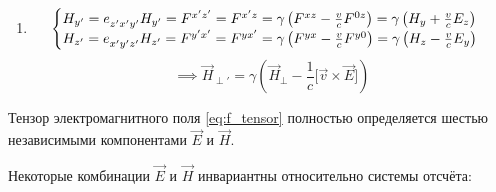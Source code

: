 \documentclass{article}
\begin{document}
\begin{enumerate}
    \item
    \begin{equation*}
        \begin{cases}
        H_{y'}=\tensor{e}{_{z'}_{x'}_{y'}}H_{y'}=\tensor{F}{^{x'}^{z'}}=\tensor{F}{^{x
        '}^{z}}=\gamma\left(\tensor{F}{^{x}^{z}}-\frac{v}{c}\tensor{F}{^{0}^{z}}\right)=\gamma\left(H_y+\frac{v}{c}E_z\right)\\
        H_{z'}=\tensor{e}{_{x'}_{y'}_{z'}}H_{z'}=\tensor{F}{^{y'}^{x'}}=\tensor{F}{^{y}^{x'}}=\gamma\left(\tensor{F}{^{y}^{x}}-\frac{v}{c}\tensor{F}{^{y}^{0}}\right)=\gamma\left(H_z-\frac{v}{c}E_y\right)\end{cases}        
    \end{equation*}
    \begin{equation*}
        \implies \vec{H}_{\perp'}=\gamma\left(\vec{H}_\perp-\frac{1}{c}\lbrack\vec{v}\times\vec{E}\rbrack\right)
    \end{equation*}
\end{enumerate}

Тензор электромагнитного поля \eqref{eq:f_tensor} полностью определяется шестью независимыми компонентами $\vec{E}$ и $\vec{H}$.

Некоторые комбинации $\vec{E}$ и $\vec{H}$ инвариантны относительно системы отсчёта:
\end{document}
